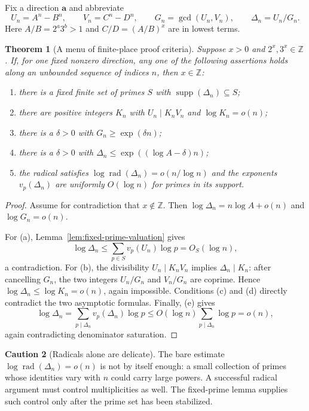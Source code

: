 \documentclass[11pt,oneside]{article}
\newtheorem{theorem}{Theorem}[section]
\theoremstyle{definition}
\newtheorem{warning}[theorem]{Caution}
\theoremstyle{remark}
\newcommand{\Z}{\mathbb Z}
\newcommand{\rad}{\operatorname{rad}}
\newcommand{\supp}{\operatorname{supp}}
\begin{document}
Fix a direction $\mathbf a$ and abbreviate
\[
 U_n=A^n-B^n,\qquad V_n=C^n-D^n,\qquad
 G_n=\gcd(U_n,V_n),\qquad \Delta_n=U_n/G_n.
\]
Here $A/B=2^a3^b>1$ and $C/D=(A/B)^x$ are in lowest terms.

\begin{theorem}[A menu of finite-place proof criteria]
\label{thm:criteria-menu}
Suppose $x>0$ and $2^x,3^x\in\Z$.  If, for one fixed nonzero direction, any one of the
following assertions holds along an unbounded sequence of indices $n$, then $x\in\Z$:
\begin{enumerate}[label=\textup{(\alph*)}]
\item there is a fixed finite set of primes $S$ with $\supp(\Delta_n)\subseteq S$;
\item there are positive integers $K_n$ with
      $U_n\mid K_nV_n$ and $\log K_n=o(n)$;
\item there is a $\delta>0$ with $G_n\ge \exp(\delta n)$;
\item there is a $\delta>0$ with
      $\Delta_n\le \exp((\log A-\delta)n)$;
\item the radical satisfies
      $\log\rad(\Delta_n)=o(n/\log n)$ and the exponents
      $v_p(\Delta_n)$ are uniformly $O(\log n)$ for primes in its support.
\end{enumerate}
\end{theorem}

\begin{proof}
Assume for contradiction that $x\notin\Z$.  Then
$\log\Delta_n=n\log A+o(n)$ and $\log G_n=o(n)$.

For (a), Lemma~\ref{lem:fixed-prime-valuation} gives
\[
 \log\Delta_n
 \le \sum_{p\in S}v_p(U_n)\log p
 =O_S(\log n),
\]
a contradiction.  For (b), the divisibility $U_n\mid K_nV_n$ implies
$\Delta_n\mid K_n$: after cancelling $G_n$, the two integers
$U_n/G_n$ and $V_n/G_n$ are coprime.  Hence
$\log\Delta_n\le\log K_n=o(n)$, again impossible.  Conditions (c) and (d) directly
contradict the two asymptotic formulas.  Finally, (e) gives
\[
 \log\Delta_n
 =\sum_{p\mid\Delta_n}v_p(\Delta_n)\log p
 \le O(\log n)\sum_{p\mid\Delta_n}\log p
 =o(n),
\]
again contradicting denominator saturation.
\end{proof}

\begin{warning}[Radicals alone are delicate]
The bare estimate $\log\rad(\Delta_n)=o(n)$ is not by itself enough: a small collection of
primes whose identities vary with $n$ could carry large powers.  A successful radical
argument must control multiplicities as well.  The fixed-prime lemma supplies such control
only after the prime set has been stabilized.
\end{warning}
\end{document}
